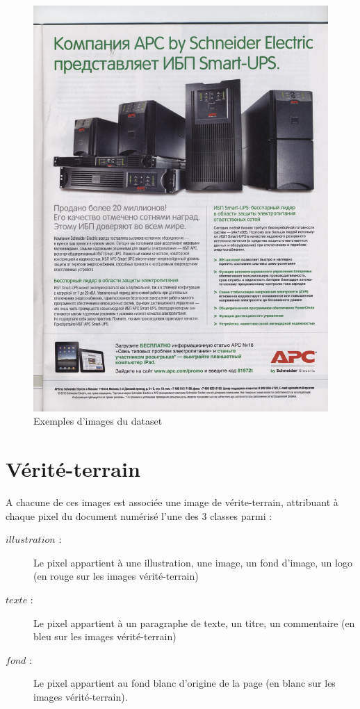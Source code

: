 \documentclass{book}
\begin{document}
\begin{figure}[H]
\begin{center}
\includegraphics[scale=0.2]{images/6.jpg}
\end{center}
\caption{Exemples d'images du dataset}
\label{exemple1}
\end{figure}
\clearpage

\section{Vérité-terrain}
A chacune de ces images est associée une image de vérite-terrain, attribuant à chaque pixel du document numérisé l'une des 3 classes parmi : \\
\begin{description} %

\item[$illustration$ :] Le pixel appartient à une illustration, une image, un fond d'image, un logo (en rouge sur les images vérité-terrain)
\item[$texte$ :] Le pixel appartient à un paragraphe de texte, un titre, un commentaire (en bleu sur les images vérité-terrain)
\item[$fond$ :] Le pixel appartient au fond blanc d'origine de la page (en blanc sur les images vérité-terrain).

\end{description}
\end{document}
